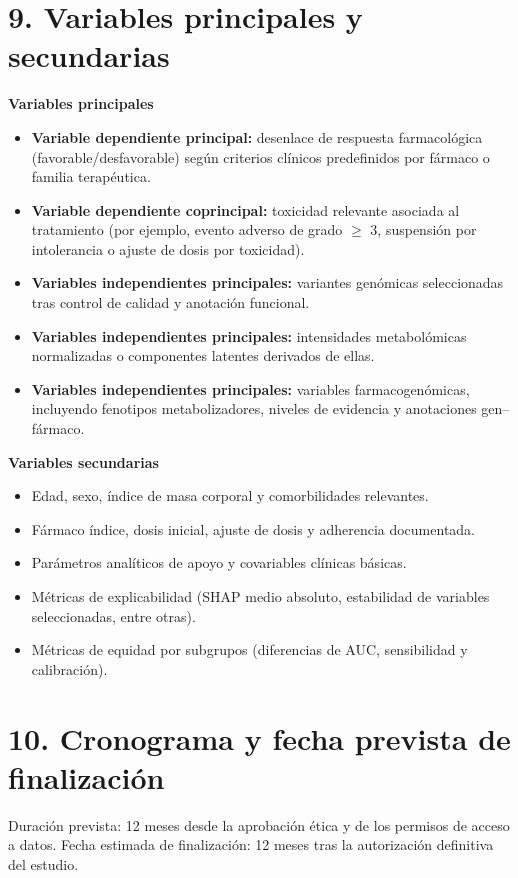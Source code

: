 \documentclass[11pt,a4paper]{article}
\begin{document}
\section*{9. Variables principales y secundarias}
\textbf{Variables principales}
\begin{itemize}
    \item \textbf{Variable dependiente principal:} desenlace de respuesta
    farmacológica (favorable/desfavorable) según criterios clínicos predefinidos
    por fármaco o familia terapéutica.
    \item \textbf{Variable dependiente coprincipal:} toxicidad relevante
    asociada al tratamiento (por ejemplo, evento adverso de grado $\geq$ 3,
    suspensión por intolerancia o ajuste de dosis por toxicidad).
    \item \textbf{Variables independientes principales:} variantes genómicas
    seleccionadas tras control de calidad y anotación funcional.
    \item \textbf{Variables independientes principales:} intensidades
    metabolómicas normalizadas o componentes latentes derivados de ellas.
    \item \textbf{Variables independientes principales:} variables
    farmacogenómicas, incluyendo fenotipos metabolizadores, niveles de evidencia
    y anotaciones gen--fármaco.
\end{itemize}

\textbf{Variables secundarias}
\begin{itemize}
    \item Edad, sexo, índice de masa corporal y comorbilidades relevantes.
    \item Fármaco índice, dosis inicial, ajuste de dosis y adherencia
    documentada.
    \item Parámetros analíticos de apoyo y covariables clínicas básicas.
    \item Métricas de explicabilidad (SHAP medio absoluto, estabilidad de
    variables seleccionadas, entre otras).
    \item Métricas de equidad por subgrupos (diferencias de AUC, sensibilidad y
    calibración).
\end{itemize}

\section*{10. Cronograma y fecha prevista de finalización}
Duración prevista: 12 meses desde la aprobación ética y de los permisos de
acceso a datos. Fecha estimada de finalización: 12 meses tras la autorización
definitiva del estudio.
\end{document}
